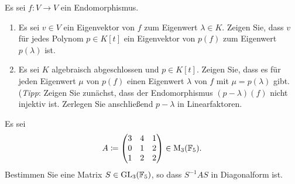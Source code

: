 \documentclass[a4paper, 10pt]{scrartcl}
\begin{document}





\begin{question}
  Es sei $f \colon V \to V$ ein Endomorphismus.
  \begin{enumerate}
    \item
      Es sei $v \in V$ ein Eigenvektor von $f$ zum Eigenwert $\lambda \in K$.
      Zeigen Sie, dass $v$ für jedes Polynom $p \in K[t]$ ein Eigenvektor von $p(f)$ zum Eigenwert $p(\lambda)$ ist.
    \item
      Es sei $K$ algebraisch abgeschlossen und $p \in K[t]$.
      Zeigen Sie, dass es für jeden Eigenwert $\mu$ von $p(f)$ einen Eigenwert $\lambda$ von $f$ mit $\mu = p(\lambda)$ gibt.
      \\
      (\emph{Tipp}:
       Zeigen Sie zunächst, dass der Endomorphismus $(p - \lambda)(f)$ nicht injektiv ist.
       Zerlegen Sie anschließend $p - \lambda$ in Linearfaktoren.
  \end{enumerate}
\end{question}





\begin{question}[subtitle = Diagonalisieren über $\Field_5$]
  Es sei
  \[
              A
    \coloneqq \begin{pmatrix}
                3 & 4 & 1 \\
                0 & 1 & 2 \\
                1 & 2 & 2
              \end{pmatrix}
    \in       \operatorname{M}_{3}(\mathbb{F}_5).
  \]
  Bestimmen Sie eine Matrix $S \in \operatorname{GL}_{3}(\mathbb{F}_5)$, so dass $S^{-1} A S$ in Diagonalform ist.
\end{question}
\end{document}
